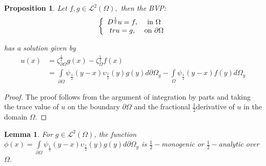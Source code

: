 \documentclass{amsart}%
\theoremstyle{plain}
\newtheorem{lemma}{Lemma}
\newtheorem{proposition}{Proposition}
\numberwithin{equation}{section}
\begin{document}
\begin{proposition}
Let $f,g\in%
\mathcal{L}%
^{2}\left(  \Omega\right)  ,$ then the BVP:
\[
\left\{
\begin{array}
[c]{cc}%
D^{\frac{1}{2}}u=f, & \text{in }\Omega\\
tru=g, & \text{on }\partial\Omega
\end{array}
\right.
\]


has a solution given by
\begin{align*}
u(x)  & =\zeta_{\partial\Omega}^{\frac{1}{2}}g(x)-\zeta_{\Omega}^{\frac{1}{2}%
}f(x)\\
& =%
{\displaystyle\int\limits_{\partial\Omega}}
\psi_{\frac{1}{2}}\left(  y-x\right)  \upsilon_{\frac{1}{2}}\left(  y\right)
g(y)d\partial\Omega_{y}-%
{\displaystyle\int\limits_{\Omega}}
\psi_{\frac{1}{2}}\left(  y-x\right)  f(y)d\Omega_{y}%
\end{align*}

\end{proposition}

\begin{proof}
The proof follows from the argument of integration by parts and taking the
trace value of $u$ on the boundary $\partial\Omega$ and the fractional
$\frac{1}{2}$derivative of $u$ in the domain $\Omega$.
\end{proof}

\begin{lemma}
For $g\in%
\mathcal{L}%
^{2}\left(  \Omega\right)  $, the function $\phi\left(  x\right)  =%
{\displaystyle\int\limits_{\partial\Omega}}
\psi_{\frac{1}{2}}\left(  y-x\right)  \upsilon_{\frac{1}{2}}\left(  y\right)
g(y)d\partial\Omega_{y}$ is $\frac{1}{2}-$monogenic or $\frac{1}{2}-$analytic
over $\Omega$.
\end{lemma}
\end{document}
